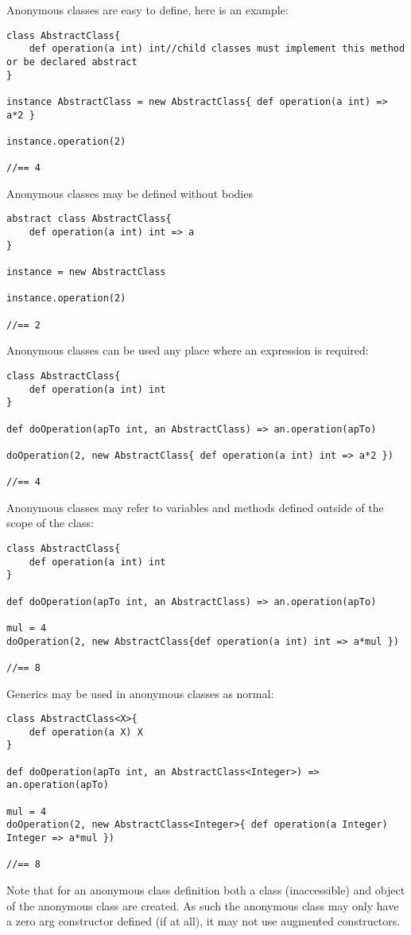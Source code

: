 \documentclass[conc-doc]{subfiles}
\begin{document}
Anonymous classes are easy to define, here is an example:
\begin{lstlisting}
class AbstractClass{
	def operation(a int) int//child classes must implement this method or be declared abstract
}

instance AbstractClass = new AbstractClass{ def operation(a int) => a*2 }

instance.operation(2)

//== 4
\end{lstlisting}

Anonymous classes may be defined without bodies
\begin{lstlisting}
abstract class AbstractClass{
	def operation(a int) int => a
}

instance = new AbstractClass

instance.operation(2)

//== 2
\end{lstlisting}

Anonymous classes can be used any place where an expression is required:
\begin{lstlisting}
class AbstractClass{
	def operation(a int) int
}

def doOperation(apTo int, an AbstractClass) => an.operation(apTo)

doOperation(2, new AbstractClass{ def operation(a int) int => a*2 })

//== 4
\end{lstlisting}

Anonymous classes may refer to variables and methods defined outside of the scope of the class:
\begin{lstlisting}
class AbstractClass{
	def operation(a int) int
}

def doOperation(apTo int, an AbstractClass) => an.operation(apTo)

mul = 4
doOperation(2, new AbstractClass{def operation(a int) int => a*mul })

//== 8
\end{lstlisting}

Generics may be used in anonymous classes as normal:
\begin{lstlisting}
class AbstractClass<X>{
	def operation(a X) X
}

def doOperation(apTo int, an AbstractClass<Integer>) => an.operation(apTo)

mul = 4
doOperation(2, new AbstractClass<Integer>{ def operation(a Integer) Integer => a*mul })

//== 8
\end{lstlisting}

Note that for an anonymous class definition both a class (inaccessible) and object of the anonymous class are created. As such the anonymous class may only have a zero arg constructor defined (if at all), it may not use augmented constructors.
\end{document}
